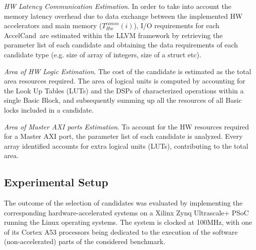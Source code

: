 \documentclass[]{usiinfthesis}
\newcommand{\candidate}{{AccelCand}}
\begin{document}
\emph{HW Latency Communication Estimation}. In order to take into
account the memory latency overhead due to data exchange between the
implemented HW accelerators and main memory ($T_{Hw}^{comm}(i)$), 
I/O requirements for each \candidate\ are
estimated within the LLVM framework by retrieving the parameter list
of each candidate and obtaining the data requirements of
each candidate type (e.g. size of array of integers, size of a struct etc).\par

\emph{Area of HW Logic Estimation}. The cost of the candidate is
estimated as the total area resources required. The area of logical units is 
computed by accounting for the Look Up Tables
(LUTs) and the DSPs of characterized operations within a single Basic
Block, and subsequently summing up all the resources of all Basic
locks included in a candidate.\par

\emph{Area of Master AXI ports Estimation}. To account for the HW
resources required for a Master AXI port, the parameter list of each
candidate is analyzed. Every array identified accounts for extra
logical units (LUTs), contributing to the total area.



\subsection{Experimental Setup}
\label{sec:setup_as}


The outcome of the selection of candidates was evaluated by implementing the 
corresponding hardware-accelerated systems on a Xilinx Zynq Ultrascale+ PSoC running the
Linux operating systems. The system is clocked at 100MHz, with one of
its Cortex A53 processors being dedicated to the execution of the
software (non-accelerated) parts of the considered benchmark.
\end{document}
